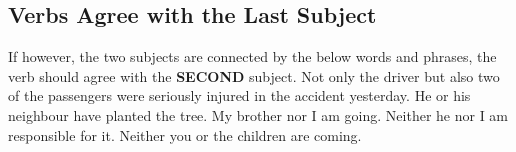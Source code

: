 \subsection{Verbs Agree with the Last Subject}
If however, the two subjects are connected by the below words and phrases, the
verb should agree with the \textbf{SECOND} subject.
\newline
\newline
{\centering
{}
}
\newline
\newline
Not only the driver but also two of the passengers were seriously injured in the
accident yesterday.
\newline
\newline
He or his neighbour have planted the tree.
\newline
\newline
My brother nor I am going.
\newline
\newline
Neither he nor I am responsible for it.
\newline
\newline
Neither you or the children are coming.

